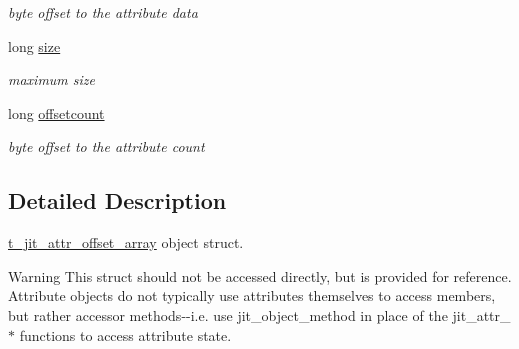 \begin{DoxyCompactItemize}
\begin{DoxyCompactList}\small\item\em byte offset to the attribute data \item\end{DoxyCompactList}\item 
\hypertarget{structt__jit__attr__offset__array_a14248651c092e6cf3e1c6c8b9e34a602}{
long \hyperlink{structt__jit__attr__offset__array_a14248651c092e6cf3e1c6c8b9e34a602}{size}}
\label{structt__jit__attr__offset__array_a14248651c092e6cf3e1c6c8b9e34a602}

\begin{DoxyCompactList}\small\item\em maximum size \item\end{DoxyCompactList}\item 
\hypertarget{structt__jit__attr__offset__array_a338fb43cb787a4ba27fec059ac1f83c1}{
long \hyperlink{structt__jit__attr__offset__array_a338fb43cb787a4ba27fec059ac1f83c1}{offsetcount}}
\label{structt__jit__attr__offset__array_a338fb43cb787a4ba27fec059ac1f83c1}

\begin{DoxyCompactList}\small\item\em byte offset to the attribute count \item\end{DoxyCompactList}\end{DoxyCompactItemize}


\subsection{Detailed Description}
\hyperlink{structt__jit__attr__offset__array}{t\_\-jit\_\-attr\_\-offset\_\-array} object struct. \begin{DoxyWarning}{Warning}
This struct should not be accessed directly, but is provided for reference. Attribute objects do not typically use attributes themselves to access members, but rather accessor methods-\/-\/i.e. use jit\_\-object\_\-method in place of the jit\_\-attr\_\-$\ast$ functions to access attribute state. 
\end{DoxyWarning}

